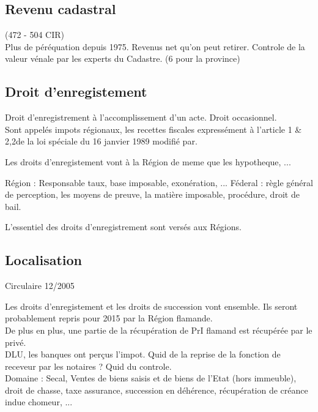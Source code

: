 \documentclass{book}
\begin{document}
\subsection{Revenu cadastral} 

(472 - 504 CIR)\\
  
Plus de péréquation depuis 1975. Revenus net qu'on peut retirer. Controle de la valeur vénale par les experts du Cadastre. (6 pour la province)\\

\subsection{Droit d'enregistement}

Droit d'enregistrement à l'accomplissement d'un acte. Droit occasionnel.\\

Sont appelés impots régionaux, les recettes fiscales expressément à l'article 1 & 2,2\degre de la loi spéciale du 16 janvier 1989 modifié par.

Les droits d'enregistement vont à la Région de meme que les hypotheque, ...

Région : Responsable taux, base imposable, exonération, ... 
Féderal : règle général de perception, les moyens de preuve, la matière imposable, procédure, droit de bail. 

L'essentiel des droits d'enregistrement sont versés aux Régions.

\subsection{Localisation}  

Circulaire 12/2005


Les droits d'enregistement et les droits de succession vont ensemble. Ils seront probablement repris pour 2015 par la Région flamande.\\

De plus en plus, une partie de la récupération de PrI flamand est récupérée par le privé.\\

DLU, les banques ont perçus l'impot. Quid de la reprise de la fonction de receveur par les notaires ? Quid du controle.  \\

Domaine : Secal, Ventes de biens saisis et de biens de l'Etat (hors immeuble), droit de chasse, taxe assurance, succession en déhérence, récupération de créance indue chomeur, ...\\
\end{document}
